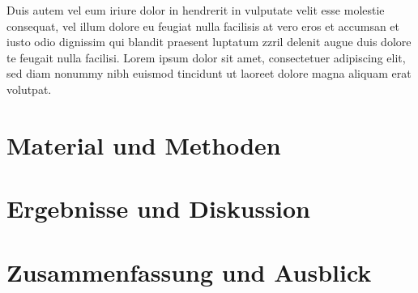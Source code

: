 \documentclass[ %
	DIV=14, %
	BCOR=20mm, %
	parskip=half, %
	headsepline, %
	cleardoublepage=empty, %
	tablecaptionabove, %
	toc=bib, %
	toc=listofnumbered, %
	listof=leveldown, %
	numbers=noendperiod %
	]{scrbook}
\renewcommand\appendix{\par
	\addchap{\appendixname}
	\setcounter{section}{0}%
	\setcounter{subsection}{0}%
	\setcounter{figure}{0}%
	\renewcommand\thesection{\Alph{section}}%
	\renewcommand\thefigure{\Alph{section}.\arabic{figure}}
	\renewcommand\thetable{\Alph{section}.\arabic{table}}
}
\begin{document}
Duis autem vel eum iriure dolor in hendrerit in vulputate velit esse molestie consequat, vel illum dolore eu feugiat nulla facilisis at vero eros et accumsan et iusto odio dignissim qui blandit praesent luptatum zzril delenit augue duis dolore te feugait nulla facilisi. Lorem ipsum dolor sit amet, consectetuer adipiscing elit, sed diam nonummy nibh euismod tincidunt ut laoreet dolore magna aliquam erat volutpat.



\chapter{Material und Methoden} %
\label{cha:material_und_methoden}


\chapter{Ergebnisse und Diskussion} %
\label{cha:ergebnisse_und_diskussion}


\chapter{Zusammenfassung und Ausblick} %
\label{cha:zusammenfassung_und_ausblick}


\printbibliography

\appendix

\listoffigures

\listoftables

\lstlistoflistings
\end{document}
